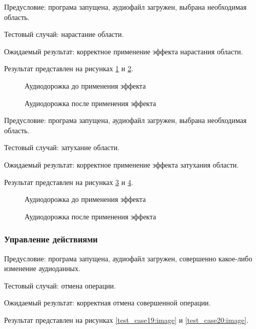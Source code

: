 Предусловие: програма запущена, аудиофайл загружен, выбрана необходимая область.

Тестовый случай: нарастание области.

Ожидаемый результат: корректное применение эффекта нарастания области.

Результат представлен на рисунках \ref{test_case15:image} и \ref{test_case16:image}.

\begin{figure}[H]
	\caption{Аудиодорожка до применения эффекта}
	\label{test_case15:image}
\end{figure}

\begin{figure}[H] 
	\caption{Аудиодорожка после применения эффекта}
	\label{test_case16:image}
\end{figure}

Предусловие: програма запущена, аудиофайл загружен, выбрана необходимая область.

Тестовый случай: затухание области.

Ожидаемый результат: корректное применение эффекта затухания области.

Результат представлен на рисунках \ref{test_case17:image} и \ref{test_case18:image}.

\begin{figure}[H]
	\caption{Аудиодорожка до применения эффекта}
	\label{test_case17:image}
\end{figure}

\begin{figure}[H] 
	\caption{Аудиодорожка после применения эффекта}
	\label{test_case18:image}
\end{figure}

\subsubsection{Управление действиями}

Предусловие: програма запущена, аудиофайл загружен, совершенно какое-либо изменение аудиоданных.

Тестовый случай: отмена операции.

Ожидаемый результат:  корректная отмена совершенной операции.

Результат представлен на рисунках \ref{test_case19:image} и \ref{test_case20:image}.

